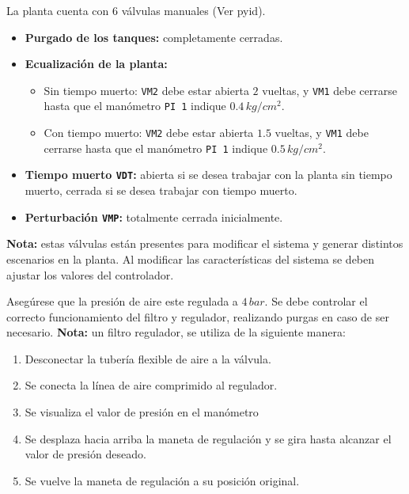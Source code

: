 \begin{tcolorbox}[title=Válvulas manuales, breakable]

La planta cuenta con 6 válvulas manuales (Ver \gls{pyid}).

 \begin{itemize}
  \item \textbf{Purgado de los tanques:} completamente cerradas.
  \item \textbf{Ecualización de la planta:}
  \begin{itemize}
   \item Sin tiempo muerto: \verb|VM2| debe estar abierta $2$ vueltas, y
   \verb|VM1| debe cerrarse hasta que el manómetro \verb|PI 1| indique
   $0.4\,kg/cm^2$.
   \item Con tiempo muerto: \verb|VM2| debe estar abierta $1.5$ vueltas, y
   \verb|VM1| debe cerrarse hasta que el manómetro \verb|PI 1| indique
   $0.5\,kg/cm^2$.
  \end{itemize}
  \item \textbf{Tiempo muerto \texttt{VDT}:} abierta si se desea trabajar con
la planta sin tiempo muerto, cerrada si se desea trabajar con tiempo muerto.
  \item \textbf{Perturbación \texttt{VMP}:} totalmente cerrada inicialmente.
 \end{itemize}
 \tcblower
 \textbf{Nota:} estas válvulas están presentes para modificar el sistema y
generar distintos
escenarios en la planta. Al modificar las características del sistema se deben
ajustar los valores del controlador.
\end {tcolorbox}

\begin{tcolorbox}[title=Presión de aire]
  Asegúrese que la presión de aire este regulada a $4\,bar$. Se debe controlar
  el correcto funcionamiento del filtro y regulador, realizando purgas en caso
de ser necesario.
 \tcblower
  \textbf{Nota:} un filtro regulador, se utiliza de la siguiente manera:
 \begin{enumerate}
    \item Desconectar la tubería flexible de aire a la válvula.
    \item Se conecta la línea de aire comprimido al regulador.
    \item Se visualiza el valor de presión en el manómetro
    \item Se desplaza hacia arriba la maneta de regulación y se gira hasta
      alcanzar el valor de presión deseado.
    \item Se vuelve la maneta de regulación a su posición original.
 \end{enumerate}
\end {tcolorbox}

